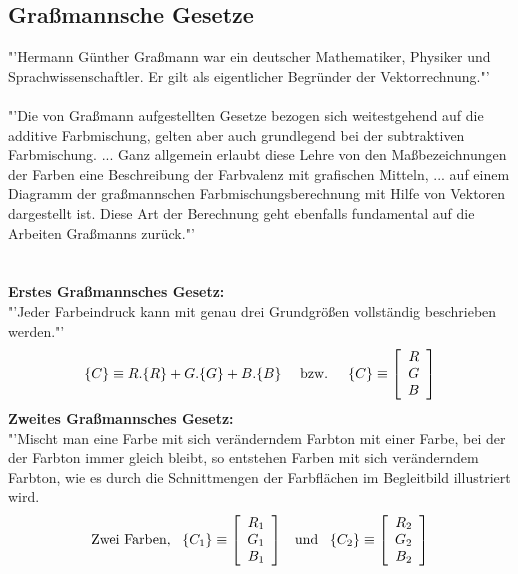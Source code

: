 \documentclass[11pt]{scrartcl}
\begin{document}
\subsection{Graßmannsche Gesetze}
"'Hermann Günther Graßmann war ein deutscher Mathematiker, Physiker und Sprachwissenschaftler. Er gilt als eigentlicher Begründer der
Vektorrechnung."'\\\cite{wikipediaGrassmann}\\
"'Die von Graßmann aufgestellten Gesetze bezogen sich weitestgehend auf die additive Farbmischung, gelten aber auch grundlegend bei der
subtraktiven Farbmischung. ... Ganz allgemein erlaubt diese Lehre von den Maßbezeichnungen der Farben eine Beschreibung der Farbvalenz
mit grafischen Mitteln, ... auf einem Diagramm der graßmannschen Farbmischungsberechnung mit Hilfe von Vektoren dargestellt ist. Diese
Art der Berechnung geht ebenfalls fundamental auf die Arbeiten Graßmanns zurück."'\\\cite{wikipediaGrassmannGestze}\\
\\
\textbf{Erstes Graßmannsches Gesetz:}\\
"'Jeder Farbeindruck kann mit genau drei Grundgrößen vollständig beschrieben werden."'
\begin{align}\label{Equ:2}
    \{C\} \equiv R.\{R\} + G.\{G\} + B.\{B\} \textrm{\hspace{1em} bzw. \hspace{1em}} \{C\} \equiv \left[ \begin{array}{r}
        R \\
        G \\
        B \\
    \end{array}\right]
\end{align}
\cite{wikipediaGrassmannGestze}
\clearpage %
\noindent
\textbf{Zweites Graßmannsches Gesetz:}\\
"'Mischt man eine Farbe mit sich veränderndem Farbton mit einer Farbe, bei der der Farbton immer gleich bleibt, so entstehen Farben mit
sich veränderndem Farbton, wie es durch die Schnittmengen der Farbflächen im Begleitbild illustriert wird.
\begin{align}\label{Equ:3}
    \textrm{Zwei Farben, \hspace{.5em}} \{C_1\} \equiv \left[ \begin{array}{r}
        R_1 \\
        G_1 \\
        B_1 \\
    \end{array}\right]
    \textrm{\hspace{.5em} und \hspace{.5em}} \{C_2\} \equiv \left[ \begin{array}{r}
        R_2 \\
        G_2 \\
        B_2 \\
    \end{array}\right]
\end{align}
\end{document}
